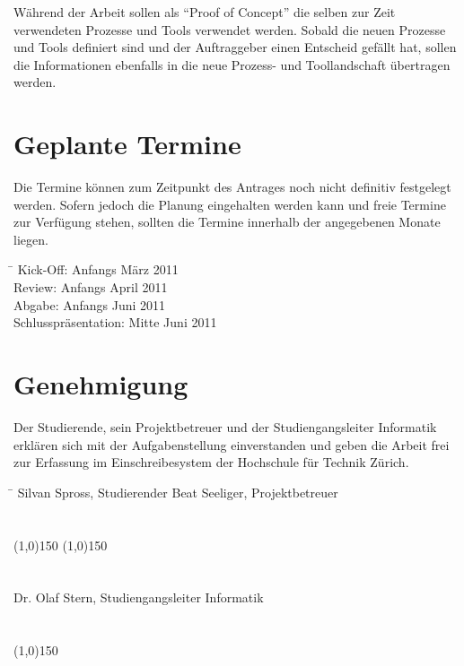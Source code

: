\documentclass[]{scrreprt}
\begin{document}
    Während der Arbeit sollen als ``Proof of Concept'' die selben zur Zeit verwendeten
    Prozesse und Tools verwendet werden. Sobald die neuen Prozesse und Tools
    definiert sind und der Auftraggeber einen Entscheid gefällt hat, sollen die
    Informationen ebenfalls in die neue Prozess- und Toollandschaft übertragen werden.

    \section{Geplante Termine}
    Die Termine können zum Zeitpunkt des Antrages noch nicht definitiv 
    festgelegt werden. Sofern jedoch die Planung eingehalten werden kann und 
    freie Termine zur Verfügung stehen, sollten die Termine innerhalb der 
    angegebenen Monate liegen.

    \begin{tabbing}
        \hspace*{4cm}\= \kill
    	Kick-Off:               \> Anfangs März 2011\\
    	Review:                 \> Anfangs April 2011\\
    	Abgabe:                 \> Anfangs Juni 2011\\
    	Schlusspräsentation:    \> Mitte Juni 2011 \\
    \end{tabbing}

    \section{Genehmigung}
    Der Studierende, sein Projektbetreuer und der Studiengangsleiter 
    Informatik erklären sich mit der Aufgabenstellung einverstanden und geben 
    die Arbeit frei zur Erfassung im Einschreibesystem der Hochschule für 
    Technik Zürich.

    \begin{tabbing}
        \hspace*{10cm}\= \kill
    	Silvan Spross, Studierender \> Beat Seeliger, Projektbetreuer \\\\\\
        \line(1,0){150} \> \line(1,0){150} \\\\\\
    	Dr. Olaf Stern, Studiengangsleiter Informatik \\\\\\
        \line(1,0){150}
    \end{tabbing}
    
    
    
    
\end{document}
